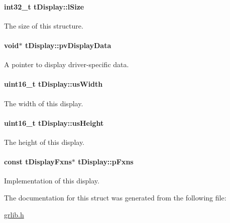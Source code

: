 \paragraph[{l\+Size}]{\setlength{\rightskip}{0pt plus 5cm}int32\+\_\+t t\+Display\+::l\+Size}\label{structt_display_ac792c2ab29b09946b4311af8d6c676b3}


The size of this structure. 

\paragraph[{pv\+Display\+Data}]{\setlength{\rightskip}{0pt plus 5cm}void$\ast$ t\+Display\+::pv\+Display\+Data}\label{structt_display_ac21f8dbe2f24b974131166da5e6579f1}


A pointer to display driver-\/specific data. 

\paragraph[{us\+Width}]{\setlength{\rightskip}{0pt plus 5cm}uint16\+\_\+t t\+Display\+::us\+Width}\label{structt_display_a17ed92807aec6dcd2b786c323870779c}


The width of this display. 

\paragraph[{us\+Height}]{\setlength{\rightskip}{0pt plus 5cm}uint16\+\_\+t t\+Display\+::us\+Height}\label{structt_display_ab4dad5fc1b211289a7ee0ed0d5957c07}


The height of this display. 

\paragraph[{p\+Fxns}]{\setlength{\rightskip}{0pt plus 5cm}const {\bf t\+Display\+Fxns}$\ast$ t\+Display\+::p\+Fxns}\label{structt_display_af4f69b9c1c6f568250d0fe13e9f95c76}


Implementation of this display. 



The documentation for this struct was generated from the following file\+:\begin{DoxyCompactItemize}
\item 
\hyperlink{grlib_8h}{grlib.\+h}\end{DoxyCompactItemize}
